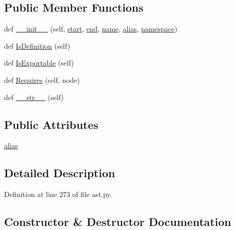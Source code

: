 \subsection*{Public Member Functions}
\begin{DoxyCompactItemize}
\item 
def \hyperlink{classcpp_1_1ast_1_1Typedef_af3275d2390190a074de470c1424e05e0}{\+\_\+\+\_\+init\+\_\+\+\_\+} (self, \hyperlink{classcpp_1_1ast_1_1Node_a7b2aa97e6a049bb1a93aea48c48f1f44}{start}, \hyperlink{classcpp_1_1ast_1_1Node_a3c5e5246ccf619df28eca02e29d69647}{end}, \hyperlink{classcpp_1_1ast_1_1__GenericDeclaration_af774f4729dfd78d0538a6782fe8514c1}{name}, \hyperlink{classcpp_1_1ast_1_1Typedef_a3187a504dfbefe50b866b44902823c30}{alias}, \hyperlink{classcpp_1_1ast_1_1__GenericDeclaration_a8aee3f11b37449d54b42a78e0a689f46}{namespace})
\item 
def \hyperlink{classcpp_1_1ast_1_1Typedef_a103bf391e665884bfbfd20fc5e6d1a19}{Is\+Definition} (self)
\item 
def \hyperlink{classcpp_1_1ast_1_1Typedef_adee58e4674b049d8e4435b5b6ad8e1d4}{Is\+Exportable} (self)
\item 
def \hyperlink{classcpp_1_1ast_1_1Typedef_aa9f65f4a97ba340f2c9ebc5e7ce27e8c}{Requires} (self, node)
\item 
def \hyperlink{classcpp_1_1ast_1_1Typedef_a451920900affc5f12e38ab8fbf5e3dea}{\+\_\+\+\_\+str\+\_\+\+\_\+} (self)
\end{DoxyCompactItemize}
\subsection*{Public Attributes}
\begin{DoxyCompactItemize}
\item 
\hyperlink{classcpp_1_1ast_1_1Typedef_a3187a504dfbefe50b866b44902823c30}{alias}
\end{DoxyCompactItemize}


\subsection{Detailed Description}


Definition at line 273 of file ast.\+py.



\subsection{Constructor \& Destructor Documentation}
\mbox{\label{classcpp_1_1ast_1_1Typedef_af3275d2390190a074de470c1424e05e0}} 
